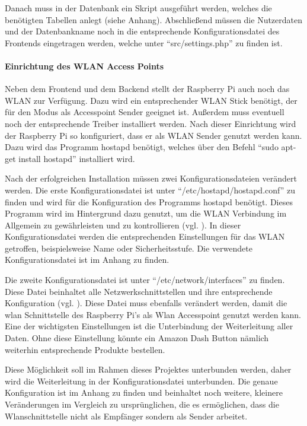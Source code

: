 Danach muss in der Datenbank ein Skript ausgeführt werden, welches die benötigten Tabellen anlegt (siehe Anhang). Abschließend müssen die Nutzerdaten und der Datenbankname noch in die entsprechende Konfigurationsdatei des Frontends eingetragen werden, welche unter ``src/settings.php'' zu finden ist. 

\paragraph{Einrichtung des WLAN Access Points}$\;$ \\ 
\label{sec:Einrichtung des WLAN Access Points-1} 
Neben dem Frontend und dem Backend stellt der Raspberry Pi auch noch das WLAN zur Verfügung. Dazu wird ein entsprechender WLAN Stick benötigt, der für den Modus als Accesspoint Sender geeignet ist. Außerdem muss eventuell noch der entsprechende Treiber installiert werden. Nach dieser Einrichtung wird der Raspberry Pi so konfiguriert, dass er als WLAN Sender genutzt werden kann. Dazu wird das Programm hostapd benötigt, welches über den Befehl ``sudo apt-get install hostapd'' installiert wird. 

Nach der erfolgreichen Installation müssen zwei Konfigurationsdateien verändert werden. Die erste Konfigurationsdatei ist unter ``/etc/hostapd/hostapd.conf'' zu finden und wird für die Konfiguration des Programms hostapd benötigt. Dieses Programm wird im Hintergrund dazu genutzt, um die WLAN Verbindung im Allgemein zu gewährleisten und zu kontrollieren (vgl. \cite{.o}\cite{.n}). In dieser Konfigurationsdatei werden die entsprechenden Einstellungen für das WLAN getroffen, beispielsweise Name oder Sicherheitsstufe. Die verwendete Konfigurationsdatei ist im Anhang zu finden.

Die zweite Konfigurationsdatei ist unter ``/etc/network/interfaces'' zu finden. Diese Datei beinhaltet alle Netzwerkschnittstellen und ihre entsprechende Konfiguration (vgl. \cite{.p}). Diese Datei muss ebenfalls verändert werden, damit die wlan Schnittstelle des Raspberry Pi's als Wlan Accesspoint genutzt werden kann. Eine der wichtigsten Einstellungen ist die Unterbindung der Weiterleitung aller Daten. Ohne diese Einstellung könnte ein Amazon Dash Button nämlich weiterhin entsprechende Produkte bestellen. 

Diese Möglichkeit soll im Rahmen dieses Projektes unterbunden werden, daher wird die Weiterleitung in der Konfigurationsdatei unterbunden. Die genaue Konfiguration ist im Anhang zu finden und beinhaltet noch weitere, kleinere Veränderungen im Vergleich zu ursprünglichen, die es ermöglichen, dass die Wlanschnittstelle nicht als Empfänger sondern als Sender arbeitet.

